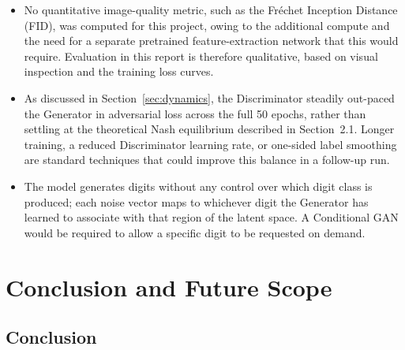 \documentclass[12pt,a4paper]{article}
\begin{document}
\begin{itemize}
    \item No quantitative image-quality metric, such as the Fr\'{e}chet Inception
          Distance (FID), was computed for this project, owing to the additional compute
          and the need for a separate pretrained feature-extraction network that this
          would require. Evaluation in this report is therefore qualitative, based on
          visual inspection and the training loss curves.
    \item As discussed in Section~\ref{sec:dynamics}, the Discriminator steadily
          out-paced the Generator in adversarial loss across the full 50 epochs, rather
          than settling at the theoretical Nash equilibrium described in
          Section~2.1. Longer training, a reduced Discriminator learning rate, or
          one-sided label smoothing are standard techniques that could improve this
          balance in a follow-up run.
    \item The model generates digits without any control over which digit class is
          produced; each noise vector maps to whichever digit the Generator has learned
          to associate with that region of the latent space. A Conditional GAN would be
          required to allow a specific digit to be requested on demand.
\end{itemize}

\section{Conclusion and Future Scope}

\subsection{Conclusion}
\end{document}
